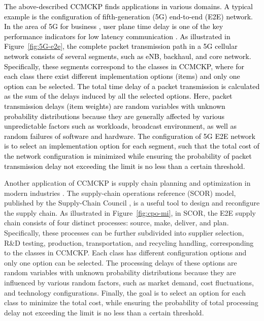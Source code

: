 \documentclass[lettersize,journal]{IEEEtran}
\begin{document}
\textcolor{black}{
The above-described CCMCKP finds applications in various domains.
A typical example is the configuration of fifth-generation (5G) end-to-end (E2E) network.
In the area of 5G for business \cite{nasrallah2018ultra}, user plane time delay is one of the key performance indicators for low latency communication \cite{5g2017view,parvez2018survey}.
As illustrated in Figure~\ref{fig:5G-e2e}, the complete packet transmission path in a 5G cellular network consists of several segments, such as eNB, backhaul, and core network.
Specifically, these segments correspond to the classes in CCMCKP, where for each class there exist different implementation options (items) and only one option can be selected.
The total time delay of a packet transmission is calculated as the sum of the delays induced by all the selected options.
Here, packet transmission delays (item weights) are random variables with unknown probability distributions because they are generally affected by various unpredictable factors such as workloads, broadcast environment, as well as random failures of software and hardware.
The configuration of 5G E2E network is to select an implementation option for each segment, such that the total cost of the network configuration is minimized while ensuring the probability of packet transmission delay not exceeding the limit is no less than a certain threshold.
}

Another application of CCMCKP is supply chain planning and optimization in modern industries \cite{sharkey2011class, taaffe2008target}.
The supply-chain operations reference (SCOR) model, published by the Supply-Chain Council \cite{huan2004review}, is a useful tool to design and reconfigure the supply chain.
As illustrated in Figure~\ref{fig:cpo-mi}, in SCOR, the E2E supply chain consists of four distinct processes: source, make, deliver, and plan.
Specifically, these processes can be further subdivided into supplier selection, R\&D testing, production, transportation, and recycling handling, corresponding to the classes in CCMCKP.
Each class has different configuration options and only one option can be selected.
The processing delays of these options are random variables with unknown probability distributions because they are influenced by various random factors, such as market demand, cost fluctuations, and technology configurations.
Finally, the goal is to select an option for each class to minimize the total cost, while ensuring the probability of total processing delay not exceeding the limit is no less than a certain threshold.
\end{document}
